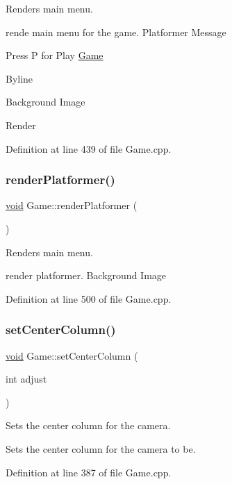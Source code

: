 Renders main menu. 

rende main menu for the game. Platformer Message

Press P for Play \mbox{\hyperlink{class_game}{Game}}

Byline

Background Image

Render 

Definition at line 439 of file Game.\+cpp.

\mbox{\label{class_game_a491f785f3a69e7d9d6539a384f00b28b}} 
\subsubsection{\texorpdfstring{renderPlatformer()}{renderPlatformer()}}
{\footnotesize\ttfamily \mbox{\hyperlink{_s_d_l__opengles2__gl2ext_8h_ae5d8fa23ad07c48bb609509eae494c95}{void}} Game\+::render\+Platformer (\begin{DoxyParamCaption}{ }\end{DoxyParamCaption})}



Renders main menu. 

render platformer. Background Image 

Definition at line 500 of file Game.\+cpp.

\mbox{\label{class_game_a0ecd12967520b3fa575420d6db016b75}} 
\subsubsection{\texorpdfstring{setCenterColumn()}{setCenterColumn()}}
{\footnotesize\ttfamily \mbox{\hyperlink{_s_d_l__opengles2__gl2ext_8h_ae5d8fa23ad07c48bb609509eae494c95}{void}} Game\+::set\+Center\+Column (\begin{DoxyParamCaption}\item[{int}]{adjust }\end{DoxyParamCaption})}



Sets the center column for the camera. 

Sets the center column for the camera to be. 

Definition at line 387 of file Game.\+cpp.

